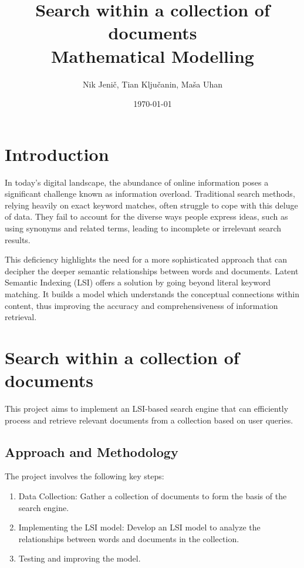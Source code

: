 \documentclass[12pt,a4paper]{article}
\title{Search within a collection of documents\\
\normalsize{Mathematical Modelling}
}
\author{Nik Jenič, Tian Ključanin, Maša Uhan}
\date{\today}
\begin{document}
\maketitle
\newpage
\tableofcontents

\newpage
\section{Introduction}

In today's digital landscape, the abundance of online information poses a significant challenge known as information overload. Traditional search methods, relying heavily on exact keyword matches, often struggle to cope with this deluge of data. They fail to account for the diverse ways people express ideas, such as using synonyms and related terms, leading to incomplete or irrelevant search results.

\bigskip
\noindent This deficiency highlights the need for a more sophisticated approach that can decipher the deeper semantic relationships between words and documents. Latent Semantic Indexing (LSI) offers a solution by going beyond literal keyword matching. It builds a model which understands the conceptual connections within content, thus improving the accuracy and comprehensiveness of information retrieval.

\newpage
\section{Search within a collection of documents}

\bigskip
\noindent This project aims to implement an LSI-based search engine that can efficiently process and retrieve relevant documents from a collection based on user queries.

\subsection{Approach and Methodology}

The project involves the following key steps:

\begin{enumerate}
    \item Data Collection: Gather a collection of documents to form the basis of the search engine.
    \item Implementing the LSI model: Develop an LSI model to analyze the relationships between words and documents in the collection.
    \item Testing and improving the model.
\end{enumerate}
\end{document}
